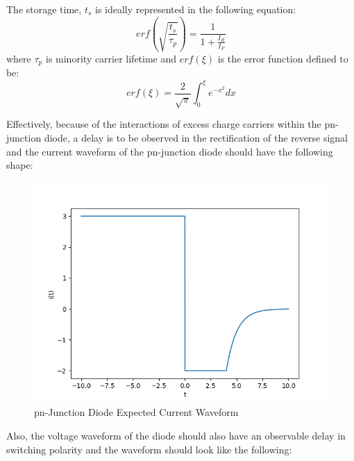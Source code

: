 The storage time, $t_{s}$ is ideally represented in the following equation:
\begin{equation}
\label{eq:diode_t_s}
erf(\sqrt{\frac{t_{s}}{\tau_{p}}}) = \frac{1}{1+\frac{I_{R}}{I_{F}}}
\end{equation}
where $\tau_{p}$ is minority carrier lifetime and $erf(\xi)$ is the error function defined to be:
\begin{equation}
\label{eq:erf}
erf(\xi) = \frac{2}{\sqrt{\pi}}\int_{0}^{\xi}e^{-x^{2}}dx
\end{equation}

Effectively, because of the interactions of excess charge carriers within the pn-junction diode, a delay is to be observed in the rectification of the reverse signal and the current waveform of the pn-junction diode should have the following shape:
\FloatBarrier
\begin{figure}[h!]
	\centering
	\includegraphics[scale=0.75]{./images/diode_current.PNG}
	\caption{pn-Junction Diode Expected Current Waveform}
	\label{fig:diode_current}
\end{figure}
\FloatBarrier
Also, the voltage waveform of the diode should also have an observable delay in switching polarity and the waveform should look like the following:
\FloatBarrier

